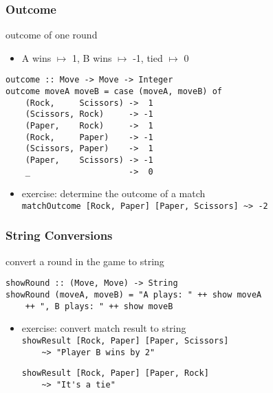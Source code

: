\documentclass[dvipsnames]{beamer}
\theoremstyle{plain}
\begin{document}
\begin{frame}[fragile]
  \frametitle{Outcome}

  \begin{exampleblock}{outcome of one round}
    \begin{itemize}
      \item A wins $\mapsto$ 1, B wins $\mapsto$ -1, tied $\mapsto$ 0
    \end{itemize}
    \begin{lstlisting}
outcome :: Move -> Move -> Integer
outcome moveA moveB = case (moveA, moveB) of
    (Rock,     Scissors) ->  1
    (Scissors, Rock)     -> -1
    (Paper,    Rock)     ->  1
    (Rock,     Paper)    -> -1
    (Scissors, Paper)    ->  1
    (Paper,    Scissors) -> -1
    _                    ->  0
    \end{lstlisting}
  \end{exampleblock}

  \pause
  \vspace{-12pt}
  \begin{itemize}
    \item exercise: determine the outcome of a match\\
      \lstinline|matchOutcome [Rock, Paper] [Paper, Scissors] ~> -2|
  \end{itemize}
\end{frame}

\begin{frame}[fragile]
  \frametitle{String Conversions}

  \begin{exampleblock}{convert a round in the game to string}
    \begin{lstlisting}
showRound :: (Move, Move) -> String
showRound (moveA, moveB) = "A plays: " ++ show moveA
    ++ ", B plays: " ++ show moveB
    \end{lstlisting}
  \end{exampleblock}

  \pause
  \vspace{-12pt}
  \begin{itemize}
    \item exercise: convert match result to string\\
      \lstinline|showResult [Rock, Paper] [Paper, Scissors]|\\
      \lstinline|    ~> "Player B wins by 2"|

      \smallskip
      \lstinline|showResult [Rock, Paper] [Paper, Rock]|\\
      \lstinline|    ~> "It's a tie"|
  \end{itemize}
\end{frame}
\end{document}
